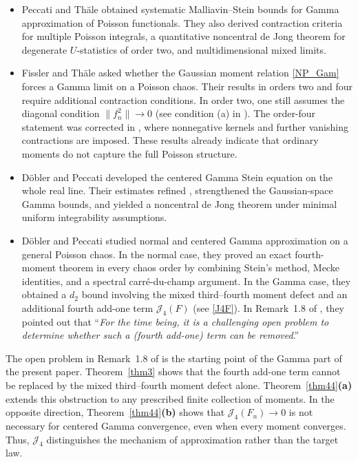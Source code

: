 \documentclass[letterpaper,11pt,reqno]{amsart}
\numberwithin{equation}{section}
\theoremstyle{plain}
\theoremstyle{definition}
\theoremstyle{remark}
\newcommand{\Jfour}{\mathcal J_4}
\begin{document}
\begin{itemize}[leftmargin=2em,itemsep=0.35em]
\item Peccati and Th\"ale \cite{PT13} obtained systematic
Malliavin--Stein bounds for Gamma approximation of Poisson functionals.
They also derived contraction criteria for multiple Poisson integrals,
a quantitative noncentral de Jong theorem for degenerate
$U$-statistics of order two, and multidimensional mixed limits.

\item Fissler and Th\"ale \cite{FT16} asked whether the Gaussian moment
relation \eqref{NP_Gam} forces a Gamma limit on a Poisson chaos.  Their
results in orders two and four require additional contraction
conditions.  In order two, one still assumes the diagonal condition
$\|f_n^2\|\to0$ (see condition (a) in \cite[Theorem 3.5]{FT16}).  
The order-four statement was corrected in
\cite{FT17}, where nonnegative kernels and further vanishing
contractions are imposed.  These results already indicate that
ordinary moments do not capture the full Poisson structure.

\item D\"obler and Peccati \cite{DP18a} developed the centered Gamma
Stein equation on the whole real line.  Their estimates refined
\cite{PT13}, strengthened the Gaussian-space Gamma bounds, and yielded
a noncentral de Jong theorem under minimal uniform integrability
assumptions.

\item D\"obler and Peccati \cite{DP18b} studied normal and centered
Gamma approximation on a general Poisson chaos. In the normal case,
they proved an exact fourth-moment theorem in every chaos order by
combining Stein's method, Mecke identities, and a spectral
carr\'e-du-champ argument. In the Gamma case, they obtained a $d_2$
bound involving the mixed third--fourth moment defect and an additional
fourth add-one term $\Jfour(F)$ (see \eqref{J4F}). In Remark~1.8 of \cite{DP18b}, they pointed out that
``{\it For the time being, it is a challenging open problem to determine whether
such a {\rm(}fourth add-one{\rm)} term can be removed}.''


\end{itemize}

The open problem in Remark~1.8 of \cite{DP18b} is the starting
point of the Gamma part of the present paper.  Theorem~\ref{thm3}
shows that the fourth add-one term cannot be replaced by the mixed
third--fourth moment defect alone.  Theorem~\ref{thm44}{\bf(a)}
extends this obstruction to any prescribed finite collection of
moments.  In the opposite direction, Theorem~\ref{thm44}{\bf(b)}
shows that $\Jfour(F_n)\to0$ is not necessary for centered Gamma
convergence, even when every moment converges.  Thus, $\Jfour$
distinguishes the mechanism of approximation rather than the target
law.
\end{document}
